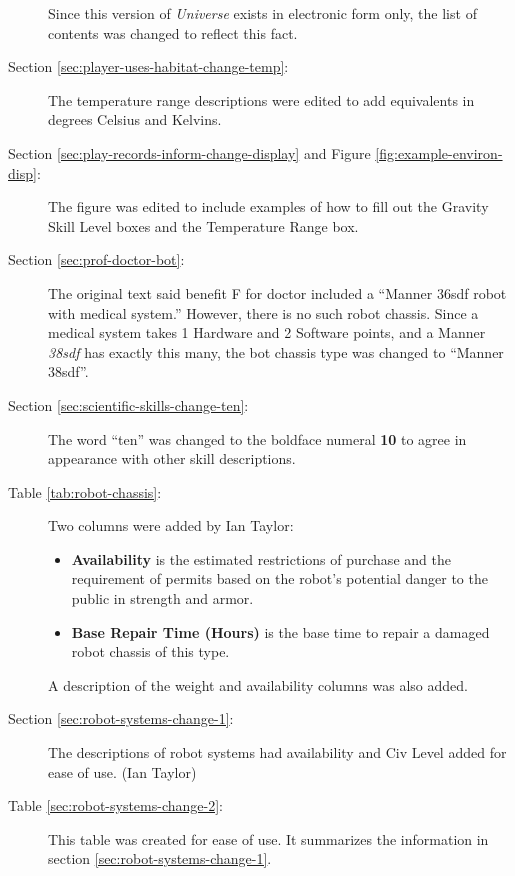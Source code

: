 \begin{description}
  Since this version of \emph{Universe} exists in electronic form
  only, the list of contents was changed to reflect this fact.

\item[Section \ref{sec:player-uses-habitat-change-temp}:] The
  temperature range descriptions were edited to add equivalents in
  degrees Celsius and Kelvins.

\item[Section \ref{sec:play-records-inform-change-display} and Figure
  \ref{fig:example-environ-disp}:] The figure was edited to include
  examples of how to fill out the Gravity Skill Level boxes and the
  Temperature Range box.

\item[Section \ref{sec:prof-doctor-bot}:] The original text said
  benefit F for doctor included a ``Manner 36sdf robot with medical
  system.''  However, there is no such robot chassis.  Since a medical
  system takes 1 Hardware and 2 Software points, and a Manner
  \emph{38sdf} has exactly this many, the bot chassis type was changed
  to ``Manner 38sdf''.

\item[Section \ref{sec:scientific-skills-change-ten}:] The word
  ``ten'' was changed to the boldface numeral \textbf{10} to agree in
  appearance with other skill descriptions.

\item[Table \ref{tab:robot-chassis}:] Two columns were added by Ian
  Taylor:
  \begin{itemize}
  \item \textbf{Availability} is the estimated restrictions of
    purchase and the requirement of permits based on the robot's
    potential danger to the public in strength and armor.
  \item \textbf{Base Repair Time (Hours)} is the base time to repair a
  damaged robot chassis of this type.
  \end{itemize}

  A description of the weight and availability columns was also added.

\item[Section \ref{sec:robot-systems-change-1}:] The descriptions of
  robot systems had availability and Civ Level added for ease of use.
  (Ian Taylor)
\item[Table \ref{sec:robot-systems-change-2}:] This table was created
  for ease of use.  It summarizes the information in section
  \ref{sec:robot-systems-change-1}. 


\end{description}
